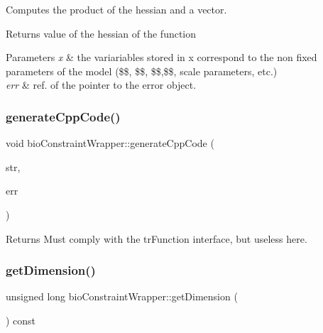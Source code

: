 Computes the product of the hessian and a vector. \begin{DoxyReturn}{Returns}
value of the hessian of the function 
\end{DoxyReturn}

\begin{DoxyParams}{Parameters}
{\em x} & the variariables stored in x correspond to the non fixed parameters of the model (\$\$, \$\$, \$\$,\$\$, scale parameters, etc.) \\
\hline
{\em err} & ref. of the pointer to the error object. \\
\hline
\end{DoxyParams}
\mbox{\label{classbio_constraint_wrapper_adf39800047df8d751b337f6f250af705}} 
\subsubsection{\texorpdfstring{generate\+Cpp\+Code()}{generateCppCode()}}
{\footnotesize\ttfamily void bio\+Constraint\+Wrapper\+::generate\+Cpp\+Code (\begin{DoxyParamCaption}\item[{ostream \&}]{str,  }\item[{pat\+Error $\ast$\&}]{err }\end{DoxyParamCaption})}

\begin{DoxyReturn}{Returns}
Must comply with the tr\+Function interface, but useless here. 
\end{DoxyReturn}
\mbox{\label{classbio_constraint_wrapper_a8af31cb2b229ca6a4b99ba2f18ca0f15}} 
\subsubsection{\texorpdfstring{get\+Dimension()}{getDimension()}}
{\footnotesize\ttfamily unsigned long bio\+Constraint\+Wrapper\+::get\+Dimension (\begin{DoxyParamCaption}{ }\end{DoxyParamCaption}) const}

